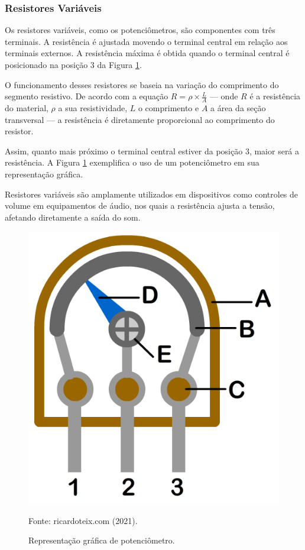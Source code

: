 \documentclass[12pt]{article}
\begin{document}
    \subsubsection{Resistores Variáveis}
    Os resistores variáveis, como os potenciômetros, são componentes com três terminais. A resistência é ajustada movendo o terminal central em relação aos terminais externos. A resistência máxima é obtida quando o terminal central é posicionado na posição 3 da Figura \ref{fig:potenciometro}.
    
    O funcionamento desses resistores se baseia na variação do comprimento do segmento resistivo. De acordo com a equação $R = \rho\times\frac{L}{A}$ --- onde $R$ é a resistência do material, $\rho$ a sua resistividade, $L$ o comprimento e $A$ a área da seção transversal --- a resistência é diretamente proporcional ao comprimento do resistor.
    
    Assim, quanto mais próximo o terminal central estiver da posição 3, maior será a resistência. A Figura \ref{fig:potenciometro} exemplifica o uso de um potenciômetro em sua representação gráfica.

    Resistores variáveis são amplamente utilizados em dispositivos como controles de volume em equipamentos de áudio, nos quais a resistência ajusta a tensão, afetando diretamente a saída do som.

    \begin{figure}[H]
        \centering
        \caption{Representação gráfica de potenciômetro.}
        \begin{minipage}{0.4\textwidth}
            \centering
            \includegraphics[width=\textwidth]{external-figures/resistor-variavel.png}
            \raggedright \footnotesize Fonte: ricardoteix.com (2021)\nocite{ricardo_teix}.
            \label{fig:potenciometro}
        \end{minipage}
    \end{figure}
\end{document}
